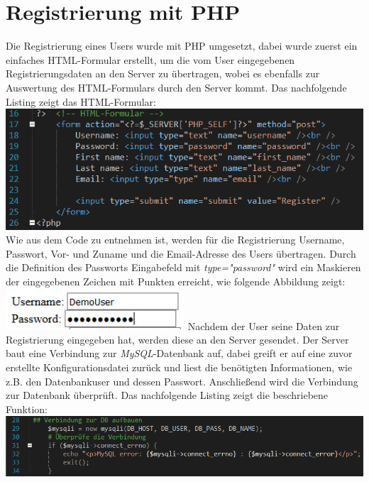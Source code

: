 \section{Registrierung mit PHP}
Die Registrierung eines Users wurde mit PHP umgesetzt, dabei wurde zuerst ein einfaches HTML-Formular erstellt, um die vom User eingegebenen Registrierungsdaten an den Server zu \"ubertragen, wobei es ebenfalls zur Auswertung des HTML-Formulars durch den Server kommt. 
Das nachfolgende Listing zeigt das HTML-Formular:
\newline
\includegraphics[width=1\textwidth]{img/vincent/abb11.png}
\newline
Wie aus dem Code zu entnehmen ist, werden f\"ur die Registrierung Username, Passwort, Vor- und Zuname und die Email-Adresse des Users \"ubertragen. Durch die Definition des Passworts Eingabefeld mit \textit{type="password"} wird ein Maskieren der eingegebenen Zeichen mit Punkten erreicht, wie folgende Abbildung zeigt:
\newline
\includegraphics[width=0.5\textwidth]{img/vincent/abb01.png}
\newline
Nachdem der User seine Daten zur Registrierung eingegeben hat, werden diese an den Server gesendet. Der Server baut eine Verbindung zur \textit{MySQL}-Datenbank auf, dabei greift er auf eine zuvor erstellte Konfigurationsdatei zurück und liest die ben\"otigten Informationen, wie z.B. den Datenbankuser und dessen Passwort. Anschlie{\ss}end wird die Verbindung zur Datenbank \"uberpr\"uft. Das nachfolgende Listing zeigt die beschriebene Funktion:
\newline
\includegraphics[width=1\textwidth]{img/vincent/abb12.png}
\newline

